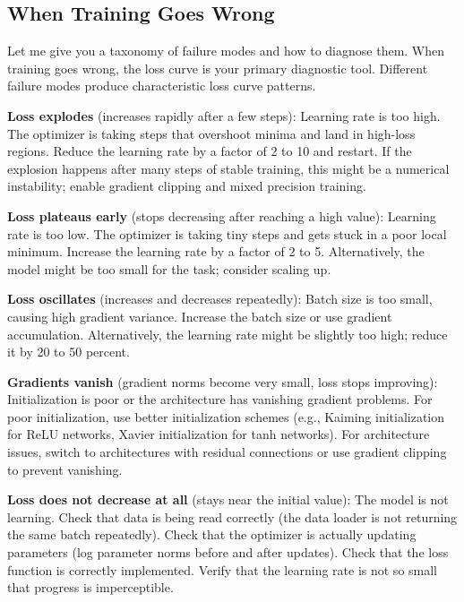 \vspace{1em}

\subsection{When Training Goes Wrong}

Let me give you a taxonomy of failure modes and how to diagnose them. When training goes wrong, the loss curve is your primary diagnostic tool. Different failure modes produce characteristic loss curve patterns.

\textbf{Loss explodes} (increases rapidly after a few steps): Learning rate is too high. The optimizer is taking steps that overshoot minima and land in high-loss regions. Reduce the learning rate by a factor of 2 to 10 and restart. If the explosion happens after many steps of stable training, this might be a numerical instability; enable gradient clipping and mixed precision training.

\textbf{Loss plateaus early} (stops decreasing after reaching a high value): Learning rate is too low. The optimizer is taking tiny steps and gets stuck in a poor local minimum. Increase the learning rate by a factor of 2 to 5. Alternatively, the model might be too small for the task; consider scaling up.

\textbf{Loss oscillates} (increases and decreases repeatedly): Batch size is too small, causing high gradient variance. Increase the batch size or use gradient accumulation. Alternatively, the learning rate might be slightly too high; reduce it by 20 to 50 percent.

\textbf{Gradients vanish} (gradient norms become very small, loss stops improving): Initialization is poor or the architecture has vanishing gradient problems. For poor initialization, use better initialization schemes (e.g., Kaiming initialization for ReLU networks, Xavier initialization for tanh networks). For architecture issues, switch to architectures with residual connections or use gradient clipping to prevent vanishing.

\textbf{Loss does not decrease at all} (stays near the initial value): The model is not learning. Check that data is being read correctly (the data loader is not returning the same batch repeatedly). Check that the optimizer is actually updating parameters (log parameter norms before and after updates). Check that the loss function is correctly implemented. Verify that the learning rate is not so small that progress is imperceptible.

